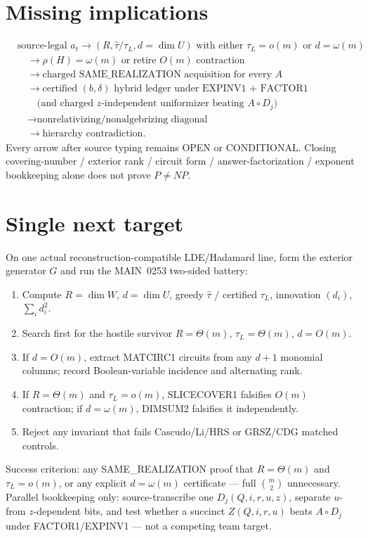 \documentclass[11pt]{article}
\begin{document}
\section*{Missing implications}
\[
\begin{aligned}
&\text{source-legal }a_t
\to (R,\widehat\tau/\tau_L,d=\dim U)\text{ with either }\tau_L=o(m)\text{ or }d=\omega(m)\\
&\quad\to\rho(H)=\omega(m)\text{ or retire }O(m)\text{ contraction}\\
&\quad\to\text{charged SAME\_REALIZATION acquisition for every }A\\
&\quad\to\text{certified }(b,\delta)\text{ hybrid ledger under EXPINV1 + FACTOR1}\\
&\quad\quad\text{(and charged }z\text{-independent uniformizer beating }A\circ D_j\text{)}\\
&\quad\to\text{nonrelativizing/nonalgebrizing diagonal}\\
&\quad\to\text{hierarchy contradiction}.
\end{aligned}
\]
Every arrow after source typing remains OPEN or CONDITIONAL. Closing covering-number / exterior
rank / circuit form / answer-factorization / exponent bookkeeping alone does not prove $P\neq NP$.

\section*{Single next target}
On one actual reconstruction-compatible LDE/Hadamard line, form the exterior generator $G$ and
run the MAIN~0253 two-sided battery:
\begin{enumerate}
\item Compute $R=\dim W$, $d=\dim U$, greedy $\widehat\tau$ / certified $\tau_L$, innovation
$(d_i)$, $\sum_i d_i^2$.
\item Search first for the hostile survivor $R=\Theta(m)$, $\tau_L=\Theta(m)$, $d=O(m)$.
\item If $d=O(m)$, extract MATCIRC1 circuits from any $d+1$ monomial columns; record
Boolean-variable incidence and alternating rank.
\item If $R=\Theta(m)$ and $\tau_L=o(m)$, SLICECOVER1 falsifies $O(m)$ contraction; if
$d=\omega(m)$, DIMSUM2 falsifies it independently.
\item Reject any invariant that fails Cascudo/Li/HRS or GRSZ/CDG matched controls.
\end{enumerate}
Success criterion: any SAME\_REALIZATION proof that $R=\Theta(m)$ and $\tau_L=o(m)$, or any
explicit $d=\omega(m)$ certificate --- full $\binom{m}{2}$ unnecessary.
Parallel bookkeeping only: source-transcribe one $D_j(Q,i,r,u,z)$, separate $u$- from
$z$-dependent bits, and test whether a succinct $Z(Q,i,r,u)$ beats $A\circ D_j$ under
FACTOR1/EXPINV1 --- not a competing team target.
\end{document}
